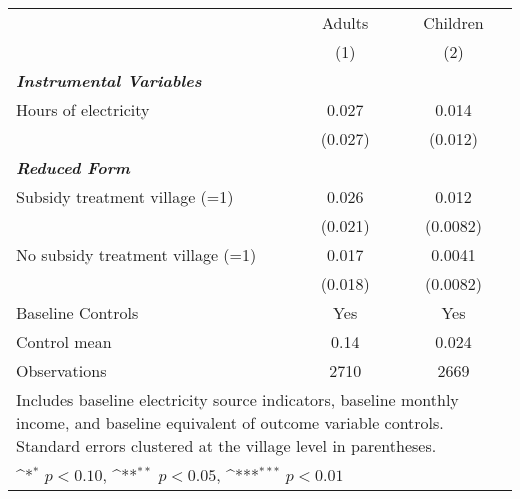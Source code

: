\def\sym#1{\ifmmode^{#1}\else\(^{#1}\)\fi}
\begin{adjustbox}{max
width={.92\textwidth},caption={Experiences respiratory problems (=1)},nofloat=table}
\begin{tabular}{l*{2}{c}}
\toprule
& Adults & Children \\
& (1) & (2) \\ \hline
\textbf{\emph{Instrumental Variables}}&         &         \\
Hours of electricity&    0.027         &    0.014         \\
                &  (0.027)         &  (0.012)         \\
\textbf{\emph{Reduced Form}}&          &                  \\
Subsidy treatment village (=1)&    0.026    &  0.012       \\
                &  (0.021)         & (0.0082)         \\
No subsidy treatment village (=1)&    0.017  &   0.0041   \\
                &  (0.018)         & (0.0082)         \\
               \addlinespace
Baseline Controls &      Yes         &      Yes         \\

Control mean           &     0.14         &    0.024         \\
Observations    &     2710         &     2669         \\
\bottomrule
\multicolumn{3}{p{\textwidth}}{\footnotesize Includes baseline electricity source indicators, baseline monthly income, and baseline equivalent of outcome variable controls. Standard errors clustered at the village level in parentheses.}\\
\multicolumn{3}{p{\textwidth}}{\footnotesize \sym{*} \(p<0.10\), \sym{**} \(p<0.05\), \sym{***} \(p<0.01\)}\\
\end{tabular}\end{adjustbox}


